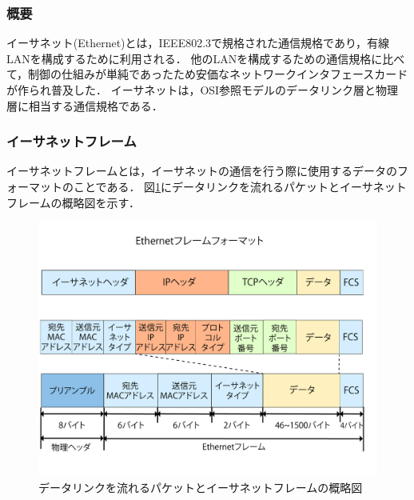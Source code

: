 \documentclass[12pt,a4j,titlepage]{ltjsarticle}
\begin{document}
\subsubsection{概要}
イーサネット(Ethernet)とは，IEEE802.3で規格された通信規格であり，有線LANを構成するために利用される．
他のLANを構成するための通信規格に比べて，制御の仕組みが単純であったため安価なネットワークインタフェースカードが作られ普及した．
イーサネットは，OSI参照モデルのデータリンク層と物理層に相当する通信規格である．

\subsubsection{イーサネットフレーム}
イーサネットフレームとは，イーサネットの通信を行う際に使用するデータのフォーマットのことである．
図\ref{fig:ether}にデータリンクを流れるパケットとイーサネットフレームの概略図を示す．

\begin{figure}[h]
\centering
\includegraphics[clip,width=140mm]{figures/ethernet.pdf}
\caption[データリンクを流れるパケットとイーサネットフレームの概略図]{データリンクを流れるパケットとイーサネットフレームの概略図\linebreak}
\label{fig:ether}
\end{figure}
\end{document}
